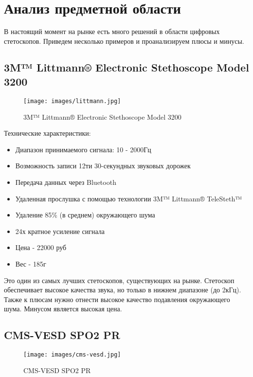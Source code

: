 \documentclass[../main.tex]{subfiles}
\begin{document}
\section{Анализ предметной области}

В настоящий момент на рынке есть много решений в области цифровых стетоскопов. Приведем несколько примеров и проанализируем плюсы и минусы.

\subsection{3M™ Littmann® Electronic Stethoscope Model 3200}
\begin{figure}[H]
\centering
\texttt{[image: images/littmann.jpg]}
\caption{3M™ Littmann® Electronic Stethoscope Model 3200}
\end{figure}

Технические характеристики:\cite{littmann}
\begin{itemize}
  \item Диапазон принимаемого сигнала: 10 - 2000Гц
  \item Возможность записи 12ти 30-секундных звуковых дорожек
  \item Передача данных через Bluetooth
  \item Удаленная прослушка с помощью технологии 3M™ Littmann® TeleSteth™
  \item Удаление 85\% (в среднем) окружающего шума
  \item 24х кратное усиление сигнала
  \item Цена - 22000 руб
  \item Вес - 185г
\end{itemize}

Это один из самых лучших стетоскопов, существующих на рынке. Стетоскоп обеспечивает высокое качества звука, но только в нижнем диапазоне (до 2кГц). Также к плюсам нужно отнести высокое качество подавления окружающего шума. Минусом является высокая цена.

\subsection{CMS-VESD SPO2 PR}
\begin{figure}[H]
\centering
\texttt{[image: images/cms-vesd.jpg]}
\caption{CMS-VESD SPO2 PR}
\end{figure}
\end{document}

